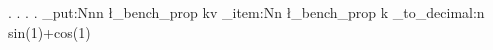 \documentclass{article}
\begin{document}
. . . .
\ExplSyntaxOn \prop_put:Nnn \l_bench_prop {k}{v} \prop_item:Nn \l_bench_prop {k} \fp_to_decimal:n { sin(1)+cos(1) } \ExplSyntaxOff
\end{document}
